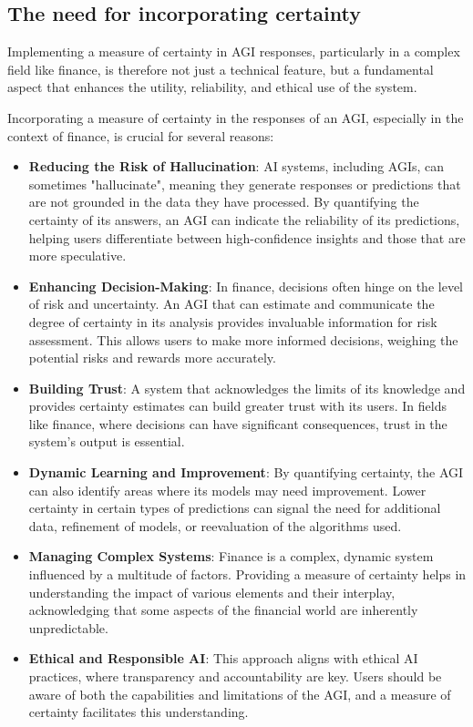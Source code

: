\documentclass[11pt, reqno]{amsart}
\theoremstyle{definition}
\theoremstyle{remark}
\begin{document}
	\subsection{The need for incorporating certainty}

	Implementing a measure of certainty in AGI responses, particularly in a complex
	field like finance, is therefore not just a technical feature, but a fundamental
	aspect that enhances the utility, reliability, and ethical use of the system.

	Incorporating a measure of certainty in the responses of an AGI,
	especially in the context of finance, is crucial for several reasons:

	\begin{itemize}
		\item \textbf{Reducing the Risk of Hallucination}: AI systems,
			including AGIs, can sometimes "hallucinate", meaning they generate
			responses or predictions that are not grounded in the data they have
			processed. By quantifying the certainty of its answers, an AGI can
			indicate the reliability of its predictions, helping users differentiate
			between high-confidence insights and those that are more speculative.

		\item \textbf{Enhancing Decision-Making}: In finance, decisions often
			hinge on the level of risk and uncertainty. An AGI that can estimate and
			communicate the degree of certainty in its analysis provides invaluable
			information for risk assessment. This allows users to make more
			informed decisions, weighing the potential risks and rewards more accurately.

		\item \textbf{Building Trust}: A system that acknowledges the limits of
			its knowledge and provides certainty estimates can build greater trust
			with its users. In fields like finance, where decisions can have significant
			consequences, trust in the system's output is essential.

		\item \textbf{Dynamic Learning and Improvement}: By quantifying certainty,
			the AGI can also identify areas where its models may need improvement.
			Lower certainty in certain types of predictions can signal the need for
			additional data, refinement of models, or reevaluation of the algorithms
			used.

		\item \textbf{Managing Complex Systems}: Finance is a complex, dynamic
			system influenced by a multitude of factors. Providing a measure of certainty
			helps in understanding the impact of various elements and their interplay,
			acknowledging that some aspects of the financial world are inherently
			unpredictable.

		\item \textbf{Ethical and Responsible AI}: This approach aligns with ethical
			AI practices, where transparency and accountability are key. Users should
			be aware of both the capabilities and limitations of the AGI, and a
			measure of certainty facilitates this understanding.
	\end{itemize}
\end{document}
